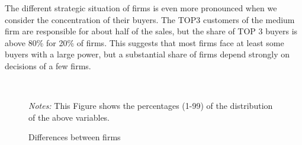 \documentclass[final, dvipsnames, authoryear,12pt]{elsarticle}
\begin{document}
The different strategic situation of firms is even more pronounced when we consider the concentration of their buyers. The TOP3 customers of the medium firm are responsible for about half of the sales, but the share of TOP 3 buyers is above 80\% for 20\% of firms. This suggests that most firms face at least some buyers with a large power, but a substantial share of firms depend strongly on decisions of a few firms.

\begin{figure}[!h]
    \caption{Differences between firms}
    \label{fig:happy_few}
    \begin{center}
    \\
    \end{center}    
        {\footnotesize \textit{Notes:} This Figure shows the percentages (1-99) of the distribution of the above variables.} 
\end{figure}
\restoregeometry
\end{document}

